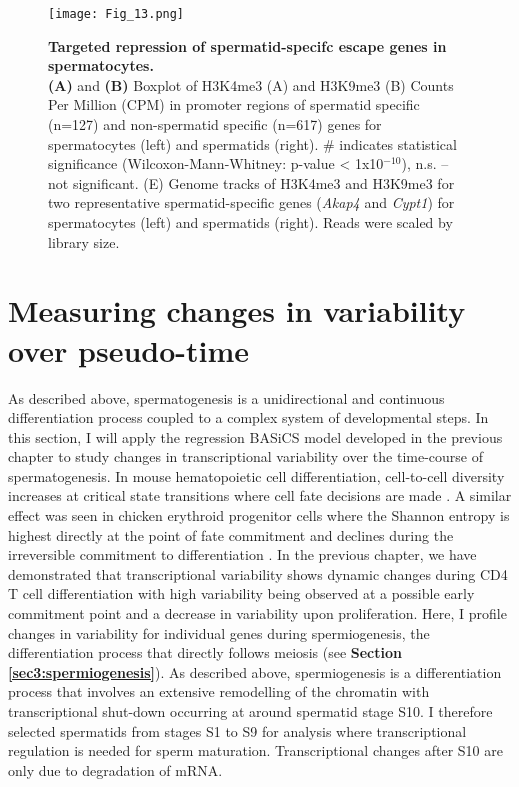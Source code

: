 \newpage

\begin{figure}[!h]
\centering
\texttt{[image: Fig\_13.png]}
\caption[Targeted repression of spermatid-specifc escape genes in spermatocytes]{\textbf{Targeted repression of spermatid-specifc escape genes in spermatocytes.} \\
\textbf{(A)} and \textbf{(B)} Boxplot of H3K4me3 (A) and H3K9me3 (B) Counts Per Million (CPM) in promoter regions of spermatid specific (n=127) and non-spermatid specific (n=617) genes for spermatocytes (left) and spermatids (right).  \# indicates statistical significance (Wilcoxon-Mann-Whitney: p-value < 1x10$^{-10}$), n.s. – not significant. 
(E) Genome tracks of H3K4me3 and H3K9me3 for two representative spermatid-specific genes (\textit{Akap4} and \textit{Cypt1}) for spermatocytes (left) and spermatids (right). Reads were scaled by library size.}
\label{fig3:K9_K4_targeted}
\end{figure}

\newpage

\section{Measuring changes in variability over pseudo-time}

As described above, spermatogenesis is a unidirectional and continuous differentiation process coupled to a complex system of developmental steps. In this section, I will apply the regression BASiCS model developed in the previous chapter to study changes in transcriptional variability over the time-course of spermatogenesis. In mouse hematopoietic cell differentiation,  cell-to-cell diversity increases at critical state transitions where cell fate decisions are made \citep{Mojtahedi2016}. A similar effect was seen in chicken erythroid progenitor cells where the Shannon entropy is highest directly at the point of fate commitment and declines during the irreversible commitment to differentiation \cite{Richard2016}. In the previous chapter, we have demonstrated that transcriptional variability shows dynamic changes during CD4\plus{} T cell differentiation with high variability being observed at a possible early commitment point and a decrease in variability upon proliferation. Here, I profile changes in variability for individual genes during spermiogenesis, the differentiation process that directly follows meiosis (see \textbf{Section \ref{sec3:spermiogenesis}}). As described above, spermiogenesis is a differentiation process that involves an extensive remodelling of the chromatin with transcriptional shut-down occurring at around spermatid stage S10. I therefore selected spermatids from stages S1 to S9 for analysis where transcriptional regulation is needed for sperm maturation. Transcriptional changes after S10 are only due to degradation of mRNA.

